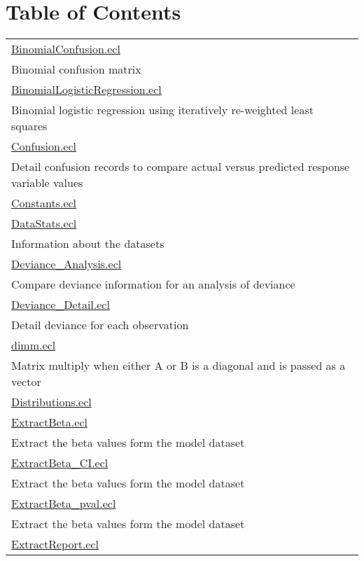 \section*{Table of Contents}
{\renewcommand{\arraystretch}{1.5}
\begin{longtable}{|p{\textwidth}|}
\hline
\hyperlink{ecldoc:toc:BinomialConfusion}{BinomialConfusion.ecl} \\
Binomial confusion matrix \\
\hline
\hyperlink{ecldoc:toc:BinomialLogisticRegression}{BinomialLogisticRegression.ecl} \\
Binomial logistic regression using iteratively re-weighted least squares \\
\hline
\hyperlink{ecldoc:toc:Confusion}{Confusion.ecl} \\
Detail confusion records to compare actual versus predicted response variable values \\
\hline
\hyperlink{ecldoc:toc:Constants}{Constants.ecl} \\
\hline
\hyperlink{ecldoc:toc:DataStats}{DataStats.ecl} \\
Information about the datasets \\
\hline
\hyperlink{ecldoc:toc:Deviance_Analysis}{Deviance\_Analysis.ecl} \\
Compare deviance information for an analysis of deviance \\
\hline
\hyperlink{ecldoc:toc:Deviance_Detail}{Deviance\_Detail.ecl} \\
Detail deviance for each observation \\
\hline
\hyperlink{ecldoc:toc:dimm}{dimm.ecl} \\
Matrix multiply when either A or B is a diagonal and is passed as a vector \\
\hline
\hyperlink{ecldoc:toc:Distributions}{Distributions.ecl} \\
\hline
\hyperlink{ecldoc:toc:ExtractBeta}{ExtractBeta.ecl} \\
Extract the beta values form the model dataset \\
\hline
\hyperlink{ecldoc:toc:ExtractBeta_CI}{ExtractBeta\_CI.ecl} \\
Extract the beta values form the model dataset \\
\hline
\hyperlink{ecldoc:toc:ExtractBeta_pval}{ExtractBeta\_pval.ecl} \\
Extract the beta values form the model dataset \\
\hline
\hyperlink{ecldoc:toc:ExtractReport}{ExtractReport.ecl} \\

\end{longtable}}
